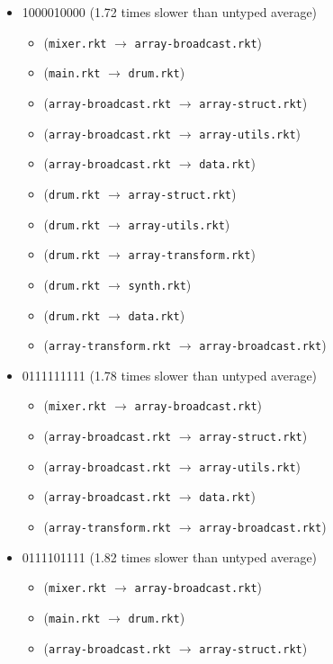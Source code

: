 \documentclass{article}
\newcommand{\mono}[1]{\texttt{#1}}
\begin{document}
\begin{itemize}
\begin{itemize}
  \end{itemize}
\item 1000010000 (1.72 times slower than untyped average)
  \begin{itemize}
  \item (\mono{mixer.rkt} $\rightarrow$ \mono{array-broadcast.rkt})
  \item (\mono{main.rkt} $\rightarrow$ \mono{drum.rkt})
  \item (\mono{array-broadcast.rkt} $\rightarrow$ \mono{array-struct.rkt})
  \item (\mono{array-broadcast.rkt} $\rightarrow$ \mono{array-utils.rkt})
  \item (\mono{array-broadcast.rkt} $\rightarrow$ \mono{data.rkt})
  \item (\mono{drum.rkt} $\rightarrow$ \mono{array-struct.rkt})
  \item (\mono{drum.rkt} $\rightarrow$ \mono{array-utils.rkt})
  \item (\mono{drum.rkt} $\rightarrow$ \mono{array-transform.rkt})
  \item (\mono{drum.rkt} $\rightarrow$ \mono{synth.rkt})
  \item (\mono{drum.rkt} $\rightarrow$ \mono{data.rkt})
  \item (\mono{array-transform.rkt} $\rightarrow$ \mono{array-broadcast.rkt})
  \end{itemize}
\item 0111111111 (1.78 times slower than untyped average)
  \begin{itemize}
  \item (\mono{mixer.rkt} $\rightarrow$ \mono{array-broadcast.rkt})
  \item (\mono{array-broadcast.rkt} $\rightarrow$ \mono{array-struct.rkt})
  \item (\mono{array-broadcast.rkt} $\rightarrow$ \mono{array-utils.rkt})
  \item (\mono{array-broadcast.rkt} $\rightarrow$ \mono{data.rkt})
  \item (\mono{array-transform.rkt} $\rightarrow$ \mono{array-broadcast.rkt})
  \end{itemize}
\item 0111101111 (1.82 times slower than untyped average)
  \begin{itemize}
  \item (\mono{mixer.rkt} $\rightarrow$ \mono{array-broadcast.rkt})
  \item (\mono{main.rkt} $\rightarrow$ \mono{drum.rkt})
  \item (\mono{array-broadcast.rkt} $\rightarrow$ \mono{array-struct.rkt})

\end{itemize}
\end{itemize}
\end{document}
